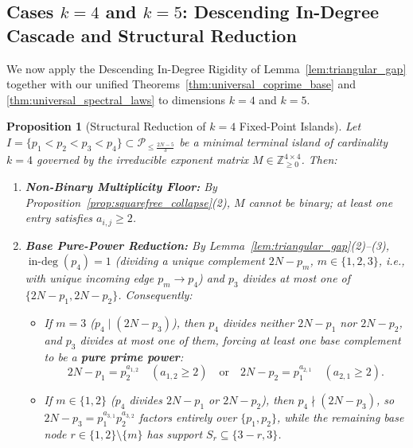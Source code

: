 \documentclass[11pt,a4paper]{article}
\newtheorem{proposition}[theorem]{Proposition}
\theoremstyle{definition}
\begin{document}
\subsection{Cases \texorpdfstring{$k = 4$}{k = 4} and \texorpdfstring{$k = 5$}{k = 5}: Descending In-Degree Cascade and Structural Reduction}
\label{subsec:k4_k5}

We now apply the Descending In-Degree Rigidity of Lemma~\ref{lem:triangular_gap} together with our unified Theorems~\ref{thm:universal_coprime_base} and \ref{thm:universal_spectral_laws} to dimensions $k = 4$ and $k = 5$.

\begin{proposition}[Structural Reduction of $k=4$ Fixed-Point Islands]
\label{prop:k4_collapse}
Let $I = \{p_1 < p_2 < p_3 < p_4\} \subset \mathcal{P}_{\le \frac{2N-5}{3}}$ be a minimal terminal island of cardinality $k = 4$ governed by the irreducible exponent matrix $M \in \mathbb{Z}_{\ge 0}^{4 \times 4}$. Then:
\begin{enumerate}
    \item \textbf{Non-Binary Multiplicity Floor:} By Proposition~\ref{prop:squarefree_collapse}(2), $M$ cannot be binary; at least one entry satisfies $a_{i,j} \ge 2$.
    \item \textbf{Base Pure-Power Reduction:} By Lemma~\ref{lem:triangular_gap}(2)--(3), $\operatorname{in-deg}(p_4) = 1$ (dividing a unique complement $2N - p_m$, $m \in \{1, 2, 3\}$, i.e., with unique incoming edge $p_m \to p_4$) and $p_3$ divides at most one of $\{2N - p_1, 2N - p_2\}$. Consequently:
    \begin{itemize}
        \item If $m = 3$ ($p_4 \mid (2N - p_3)$), then $p_4$ divides neither $2N - p_1$ nor $2N - p_2$, and $p_3$ divides at most one of them, forcing at least one base complement to be a \textbf{pure prime power}:
        \begin{equation}
        \label{eq:k4_pure_power}
        2N - p_1 = p_2^{a_{1,2}} \quad (a_{1,2} \ge 2) \quad \text{or} \quad 2N - p_2 = p_1^{a_{2,1}} \quad (a_{2,1} \ge 2).
        \end{equation}
        \item If $m \in \{1, 2\}$ ($p_4$ divides $2N - p_1$ or $2N - p_2$), then $p_4 \nmid (2N - p_3)$, so $2N - p_3 = p_1^{a_{3,1}} p_2^{a_{3,2}}$ factors entirely over $\{p_1, p_2\}$, while the remaining base node $r \in \{1, 2\} \setminus \{m\}$ has support $S_r \subseteq \{3 - r, 3\}$.
    \end{itemize}

\end{enumerate}
\end{proposition}
\end{document}
